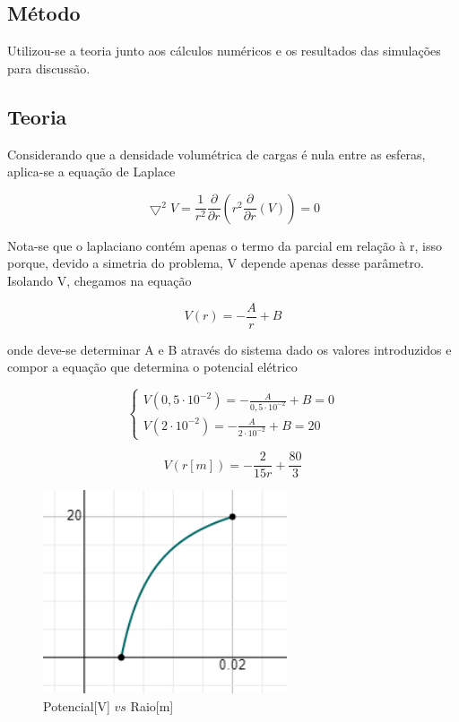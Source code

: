 \documentclass[a4paper]{article}
\begin{document}
\begin{multicols}{2}
	
	\section{Método}
	Utilizou-se a teoria junto aos cálculos numéricos e os resultados das simulações para discussão.
	\subsection{Teoria}
	Considerando que a densidade volumétrica de cargas é nula entre as esferas, aplica-se a equação de Laplace
	
	\begin{equation} \label{eq:laplaciano}
		\boxed{\bigtriangledown ^2V=\frac{1}{r^2}\frac{\partial }{\partial r}\left(r^2\frac{\partial }{\partial r}\left(V\right)\right)=0}
	\end{equation}
	
	Nota-se que o laplaciano contém apenas o termo da parcial em relação à r, isso porque, devido a simetria do problema, V depende apenas desse parâmetro.\\
	
	Isolando V, chegamos na equação
	
	\begin{equation} \label{eq:potencialab}
		\boxed{V(r)=-\frac{A}{r}+B} 
	\end{equation}
	
	\noindent onde deve-se determinar A e B através do sistema dado os valores introduzidos e compor a equação que determina o potencial elétrico
	
	\begin{equation} \label{eq:matriz}
		\boxed{\left\{\begin{matrix}
		V\left(0,5\cdot 10^{-2}\right)=-\frac{A}{0,5\cdot 10^{-2}}+B=0
		\\ 
		V\left(2\cdot 10^{-2}\right)=-\frac{A}{2\cdot 10^{-2}}+B=20
	\end{matrix}\right.}
	\end{equation}
	
	
	\begin{equation} \label{eq:potencial}
		\boxed{V\left(r[m]\right)=-\frac{2}{15r}+\frac{80}{3}}
	\end{equation}


\begin{figure} [H]
	\centering
	\caption{Potencial[V] $vs$ Raio[m]\label{fig:potencial}}
	\includegraphics[height=6cm,fbox]{latex/vr.png}
\end{figure}
	

\end{multicols}
\end{document}
